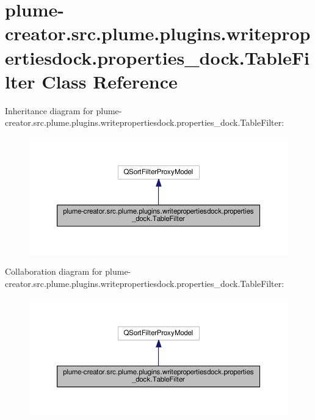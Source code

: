 \hypertarget{classplume-creator_1_1src_1_1plume_1_1plugins_1_1writepropertiesdock_1_1properties__dock_1_1_table_filter}{}\section{plume-\/creator.src.\+plume.\+plugins.\+writepropertiesdock.\+properties\+\_\+dock.\+Table\+Filter Class Reference}
\label{classplume-creator_1_1src_1_1plume_1_1plugins_1_1writepropertiesdock_1_1properties__dock_1_1_table_filter}


Inheritance diagram for plume-\/creator.src.\+plume.\+plugins.\+writepropertiesdock.\+properties\+\_\+dock.\+Table\+Filter\+:\nopagebreak
\begin{figure}[H]
\begin{center}
\leavevmode
\includegraphics[width=350pt]{classplume-creator_1_1src_1_1plume_1_1plugins_1_1writepropertiesdock_1_1properties__dock_1_1_table_filter__inherit__graph}
\end{center}
\end{figure}


Collaboration diagram for plume-\/creator.src.\+plume.\+plugins.\+writepropertiesdock.\+properties\+\_\+dock.\+Table\+Filter\+:\nopagebreak
\begin{figure}[H]
\begin{center}
\leavevmode
\includegraphics[width=350pt]{classplume-creator_1_1src_1_1plume_1_1plugins_1_1writepropertiesdock_1_1properties__dock_1_1_table_filter__coll__graph}
\end{center}
\end{figure}
